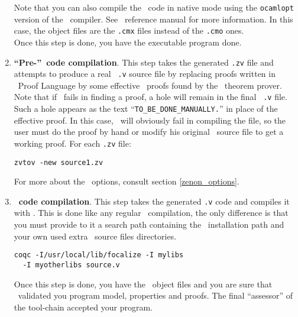 \begin{enumerate}
    Note that you can also compile the \ocaml\ code in native mode
    using the {\tt ocamlopt} version of the \ocaml\ compiler. See
    \ocaml\ reference manual for more information. In this case, the
    object files are the {\tt .cmx} files instead of the {\tt .cmo}
    ones.\\
    Once this step is done, you have the executable program done.

  \item {\bf ``Pre-''\coq\ code compilation}. This step takes the
    generated {\tt .zv} file and attempts to produce a real \coq\
    {\tt .v} source file by replacing proofs written in \focal\ Proof
    Language by some effective \coq\ proofs found by the \zenon\
    theorem prover. Note that if \zenon\ fails in finding a proof, a
    hole will remain in the final \coq\ {\tt .v} file. Such a hole
    appears as the text ``{\tt TO\_BE\_DONE\_MANUALLY.}'' in place of
    the effective proof. In this case, \coq\ will obviously fail
    in compiling the file, so the user must do the proof by hand or
    modify his original \focal\ source file to get a working proof.
    For each {\tt .zv} file:
    \begin{center}
      {\tt zvtov -new source1.zv}
    \end{center}
    For more about the \zenon\ options, consult section
    \ref{zenon_options}.

  \item{\bf \coq\ code compilation}. This step takes the generated
    {\tt .v} code and compiles it with \coq. This is done like any
    regular \coq\ compilation, the only difference is that you must
    provide to it a search path containing the \focal\ installation
    path and your own used extra \focal\ source files directories.
    \begin{verbatim}
coqc -I/usr/local/lib/focalize -I mylibs
  -I myotherlibs source.v
    \end{verbatim}
    Once this step is done, you have the \coq\ object files and you
    are sure that \coq\ validated you program model, properties and
    proofs. The final ``assessor'' of the tool-chain accepted your
    program.
\end{enumerate}
